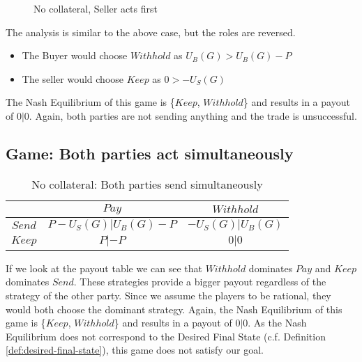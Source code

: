 \documentclass{cacthesis}
\begin{document}
\begin{figure}[htb!]
\label{fig:nocol-seller-first}
\caption{No collateral, Seller acts first}
\end{figure}


The analysis is similar to the above case, but the roles are reversed. 
\begin{itemize}
    \item The Buyer would choose $Withhold$ as $U_B(G) > U_B(G)-P$
    \item The seller would choose $Keep$ as $0 > -U_S(G)$
\end{itemize}
The Nash Equilibrium of this game is \{$Keep$, $Withhold$\} and results in a payout of $0|0$. Again, both parties are not sending anything and the trade is unsuccessful.

\subsection{Game: Both parties act simultaneously} 

\begin{table}[htb!]
    \centering
    \begin{tabular}{ c||c|c| }
    & $Pay$ & $Withhold$  \\
    \hline
    \hline
    $Send$ & $P - U_S(G)|U_B(G) - P$ & $-U_S(G) | U_B(G)$ \\
    \hline
    $Keep$ & $P |-P$ & $0 | 0$ \\ 
    \hline
    \end{tabular}
    \label{fig:nocol-simultaneous}
    \caption{No collateral: Both parties send simultaneously}
\end{table}
If we look at the payout table we can see that $Withhold$ dominates $Pay$ and $Keep$ dominates $Send$. These strategies provide a bigger payout regardless of the strategy of the other party.
Since we assume the players to be rational, they would both choose the dominant strategy.
Again, the Nash Equilibrium of this game is \{$Keep$, $Withhold$\} and results in a payout of $0|0$. As the Nash Equilibrium does not correspond to the Desired Final State (c.f. Definition \ref{def:desired-final-state}), this game does not satisfy our goal.\newline
\end{document}
